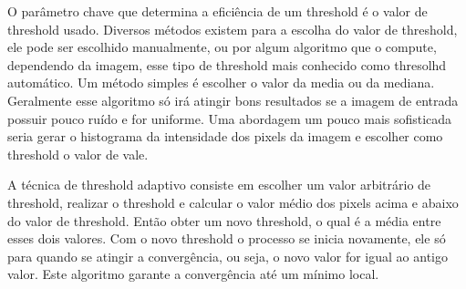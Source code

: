 O parâmetro chave que determina a eficiência de um threshold é o valor de threshold usado. Diversos métodos existem para a escolha do valor de threshold, ele pode ser escolhido manualmente, ou por algum algoritmo que o compute, dependendo da imagem, esse tipo de threshold mais conhecido como thresolhd automático. Um método simples é escolher o valor da media ou da mediana. Geralmente esse algoritmo só irá atingir bons resultados se a imagem de entrada possuir pouco ruído e for uniforme. Uma abordagem um pouco mais sofisticada seria gerar o histograma da intensidade dos pixels da imagem e escolher como threshold o valor de vale.

A técnica de threshold adaptivo consiste em escolher um valor arbitrário de threshold, realizar o threshold e calcular o valor médio dos pixels acima e abaixo do valor de threshold. Então obter um novo threshold, o qual é a média entre esses dois valores. Com o novo threshold o processo se inicia novamente, ele só para quando se atingir a convergência, ou seja, o novo valor for igual ao antigo valor. Este algoritmo garante a convergência até um mínimo local.